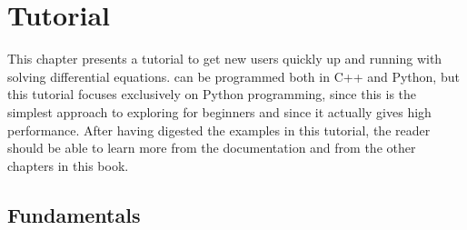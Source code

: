\newcommand{\langtangenxpoint}{{x}}
\newcommand{\langtangennormalvec}{{n}}
\newcommand{\langtangenep}{\thinspace . }
\newcommand{\para}[1]{\paragraph{#1}}
\newcommand{\langtangenidx}[1]{\index{#1@\emp{#1}}}
\newcommand{\Vghat}{\hat{V}^{(\mbox{g})}}
\newcommand{\Vg}{V^{(\mbox{g})}}
\newcommand{\ue}{u_{\mbox{e}}}
\newcommand{\gln}{\vspace{2mm}\par}

\chapter{Tutorial}
\label{langtangen}

This chapter presents a \fenics{} tutorial to get new users quickly up
and running with solving differential equations. \fenics{} can be
programmed both in C++ and Python, but this tutorial focuses
exclusively on Python programming, since this is the simplest approach
to exploring \fenics{} for beginners and since it actually gives high
performance. After having digested the examples in this tutorial, the
reader should be able to learn more from the \fenics{} documentation
and from the other chapters in this book.

\section{Fundamentals}
\label{langtangen:fundamentals}


